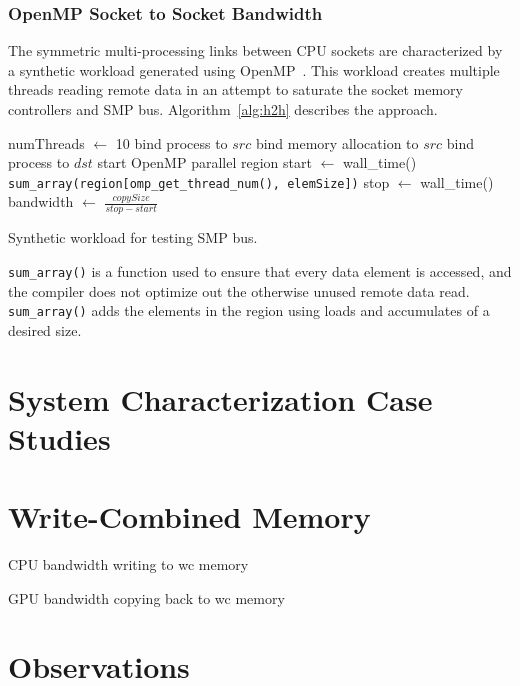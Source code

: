 \subsubsection{OpenMP Socket to Socket Bandwidth}

The symmetric multi-processing links between CPU sockets are characterized by a synthetic workload generated using OpenMP~\cite{openmp2013}.
This workload creates multiple threads reading remote data in an attempt to saturate the socket memory controllers and SMP bus.
Algorithm~\ref{alg:h2h} describes the approach.

\begin{algorithm}[ht]
    \SetAlgoLined
    numThreads $\gets$ 10\;
    \;
     {
        bind process to $src$\;
        bind memory allocation to $src$\;
        bind process to $dst$\;
        start OpenMP parallel region\;
        start $\gets$ wall\_time()\;
        \texttt{sum\_array(region[omp\_get\_thread\_num(), elemSize])}\;
        stop $\gets$ wall\_time()\;
        bandwidth $\gets$ $\frac{copySize}{stop - start}$\;
    }
    \caption{Synthetic workload for testing SMP bus.}
    \label{alg:h2h}
\end{algorithm}

\texttt{sum\_array()} is a function used to ensure that every data element is accessed, and the compiler does not optimize out the otherwise unused remote data read.
\texttt{sum\_array()} adds the elements in the region using loads and accumulates of a desired size.


\section{System Characterization Case Studies}



\section{Write-Combined Memory}

CPU bandwidth writing to wc memory

GPU bandwidth copying back to wc memory


\section{Observations}

